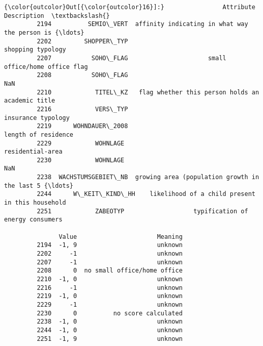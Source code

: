 \documentclass[11pt]{article}
\begin{document}
\begin{Verbatim}[commandchars=\\\{\}]
{\color{outcolor}Out[{\color{outcolor}16}]:}                Attribute                                        Description  \textbackslash{}
         2194          SEMIO\_VERT  affinity indicating in what way the person is {\ldots}   
         2202         SHOPPER\_TYP                                  shopping typology   
         2207           SOHO\_FLAG                      small office/home office flag   
         2208           SOHO\_FLAG                                                NaN   
         2210            TITEL\_KZ   flag whether this person holds an academic title   
         2216            VERS\_TYP                                insurance typology    
         2219      WOHNDAUER\_2008                                length of residence   
         2229            WOHNLAGE                                  residential-area    
         2230            WOHNLAGE                                                NaN   
         2238  WACHSTUMSGEBIET\_NB  growing area (population growth in the last 5 {\ldots}   
         2244      W\_KEIT\_KIND\_HH    likelihood of a child present in this household   
         2251            ZABEOTYP                   typification of energy consumers   
         
               Value                      Meaning  
         2194  -1, 9                      unknown  
         2202     -1                      unknown  
         2207     -1                      unknown  
         2208      0  no small office/home office  
         2210  -1, 0                      unknown  
         2216     -1                      unknown  
         2219  -1, 0                      unknown  
         2229     -1                      unknown  
         2230      0          no score calculated  
         2238  -1, 0                      unknown  
         2244  -1, 0                      unknown  
         2251  -1, 9                      unknown  
\end{Verbatim}
            
\end{document}
